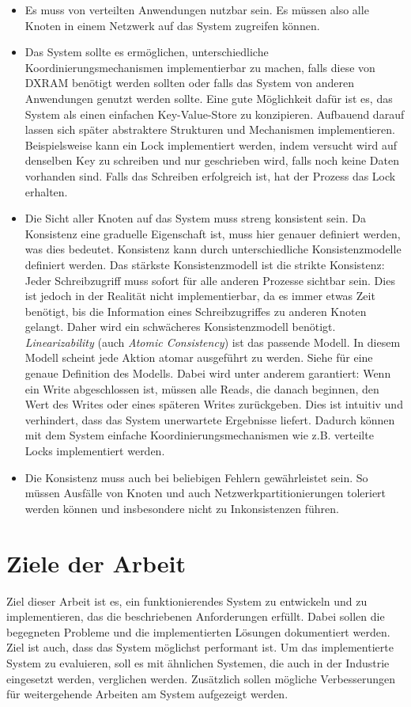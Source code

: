 \begin{itemize}
	\item Es muss von verteilten Anwendungen nutzbar sein. Es müssen also alle Knoten in einem Netzwerk auf das System zugreifen können.
	\item Das System sollte es ermöglichen, unterschiedliche Koordinierungsmechanismen implementierbar zu machen, falls diese von DXRAM benötigt werden sollten oder falls das System von anderen Anwendungen genutzt werden sollte. Eine gute Möglichkeit dafür ist es, das System als einen einfachen Key-Value-Store zu konzipieren. Aufbauend darauf lassen sich später abstraktere Strukturen und Mechanismen implementieren. Beispielsweise kann ein Lock implementiert werden, indem versucht wird auf denselben Key zu schreiben und nur geschrieben wird, falls noch keine Daten vorhanden sind. Falls das Schreiben erfolgreich ist, hat der Prozess das Lock erhalten.
	\item Die Sicht aller Knoten auf das System muss streng konsistent sein. Da Konsistenz eine graduelle Eigenschaft ist, muss hier genauer definiert werden, was dies bedeutet. Konsistenz kann durch unterschiedliche Konsistenzmodelle definiert werden. Das stärkste Konsistenzmodell ist die strikte Konsistenz: Jeder Schreibzugriff muss sofort für alle anderen Prozesse sichtbar sein. Dies ist jedoch in der Realität nicht implementierbar, da es immer etwas Zeit benötigt, bis die Information eines Schreibzugriffes zu anderen Knoten gelangt. Daher wird ein schwächeres Konsistenzmodell benötigt.  \textit{Linearizability} (auch \textit{Atomic Consistency}) ist das passende Modell. In diesem Modell scheint jede Aktion atomar ausgeführt zu werden. Siehe \cite{linearizability} für eine genaue Definition des Modells. Dabei wird unter anderem garantiert: Wenn ein Write abgeschlossen ist, müssen alle Reads, die danach beginnen, den Wert des Writes oder eines späteren Writes zurückgeben. Dies ist intuitiv und verhindert, dass das System unerwartete Ergebnisse liefert. Dadurch können mit dem System einfache Koordinierungsmechanismen wie z.B. verteilte Locks implementiert werden.
	\item Die Konsistenz muss auch bei beliebigen Fehlern gewährleistet sein. So müssen Ausfälle von Knoten und auch Netzwerkpartitionierungen toleriert werden können und insbesondere nicht zu Inkonsistenzen führen.
\end{itemize}

\section{Ziele der Arbeit}
\label{ziele}

Ziel dieser Arbeit ist es, ein funktionierendes System zu entwickeln und zu implementieren, das die beschriebenen Anforderungen erfüllt. Dabei sollen die begegneten Probleme und die implementierten Lösungen dokumentiert werden. Ziel ist auch, dass das System möglichst performant ist. Um das implementierte System zu evaluieren, soll es mit ähnlichen Systemen, die auch in der Industrie eingesetzt werden, verglichen werden. Zusätzlich sollen mögliche Verbesserungen für weitergehende Arbeiten am System aufgezeigt werden.
